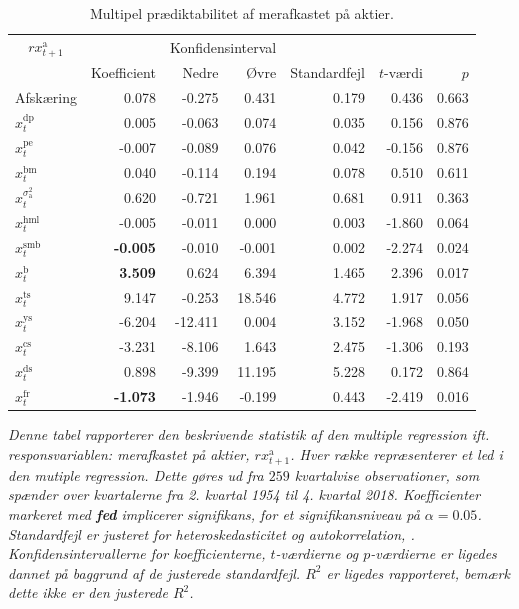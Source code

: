 \documentclass[
  a4paper,
  oneside]{memoir}
\begin{document}
\begin{table}[H]

\caption{\label{tab:MULT-ak}Multipel prædiktabilitet af merafkastet på aktier.}
\centering
\begin{threeparttable}
\begin{tabular}[t]{lrrrrrr}
\toprule
\multicolumn{1}{c}{$rx_{t+1}^{\text{a}}$} & \multicolumn{1}{c}{ } & \multicolumn{2}{c}{Konfidensinterval} & \multicolumn{3}{c}{ } \\
\cmidrule(l{3pt}r{3pt}){1-1} \cmidrule(l{3pt}r{3pt}){3-4}
  & Koefficient & Nedre & Øvre & Standardfejl & $t$-værdi & $p$\\
\midrule
\rowcolor{gray!6}  Afskæring & 0.078 & -0.275 & 0.431 & 0.179 & 0.436 & 0.663\\
$x_t^{\text{dp}}$ & 0.005 & -0.063 & 0.074 & 0.035 & 0.156 & 0.876\\
\rowcolor{gray!6}  $x_t^{\text{pe}}$ & -0.007 & -0.089 & 0.076 & 0.042 & -0.156 & 0.876\\
$x_t^{\text{bm}}$ & 0.040 & -0.114 & 0.194 & 0.078 & 0.510 & 0.611\\
\rowcolor{gray!6}  $x_t^{\sigma_{\text{a}}^2}$ & 0.620 & -0.721 & 1.961 & 0.681 & 0.911 & 0.363\\
$x_t^{\text{hml}}$ & -0.005 & -0.011 & 0.000 & 0.003 & -1.860 & 0.064\\
\rowcolor{gray!6}  $x_t^{\text{smb}}$ & \textbf{-0.005} & -0.010 & -0.001 & 0.002 & -2.274 & 0.024\\
$x_t^{\text{b}}$ & \textbf{ 3.509} & 0.624 & 6.394 & 1.465 & 2.396 & 0.017\\
\rowcolor{gray!6}  $x_t^{\text{ts}}$ & 9.147 & -0.253 & 18.546 & 4.772 & 1.917 & 0.056\\
$x_t^{\text{ys}}$ & -6.204 & -12.411 & 0.004 & 3.152 & -1.968 & 0.050\\
\rowcolor{gray!6}  $x_t^{\text{cs}}$ & -3.231 & -8.106 & 1.643 & 2.475 & -1.306 & 0.193\\
$x_t^{\text{ds}}$ & 0.898 & -9.399 & 11.195 & 5.228 & 0.172 & 0.864\\
\rowcolor{gray!6}  $x_t^{\text{fr}}$ & \textbf{-1.073} & -1.946 & -0.199 & 0.443 & -2.419 & 0.016\\
\bottomrule
\end{tabular}
\begin{tablenotes}
\item \textit{Denne tabel rapporterer den beskrivende statistik af den multiple regression ift. responsvariablen: merafkastet på aktier, $rx_{t+1}^{\text{a}}$. Hver række repræsenterer et led i den mutiple regression. Dette gøres ud fra $259$ kvartalvise observationer, som spænder over kvartalerne fra 2. kvartal 1954 til 4. kvartal 2018. Koefficienter markeret med \textbf{fed} implicerer signifikans, for et signifikansniveau på $\alpha=0.05$. Standardfejl er justeret for heteroskedasticitet og autokorrelation, \citep{Newey1987}. Konfidensintervallerne for koefficienterne, $t$-værdierne og $p$-værdierne er ligedes dannet på baggrund af de justerede standardfejl. $R^2$ er ligedes rapporteret, bemærk dette ikke er den justerede $R^2$.}
\end{tablenotes}
\end{threeparttable}
\end{table}
\end{document}
